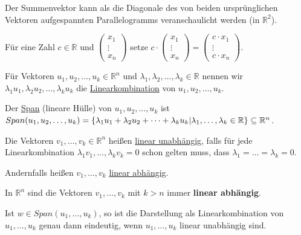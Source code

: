 \documentclass{mg2}
\begin{document}
Der Summenvektor kann als die Diagonale des von beiden ursprünglichen Vektoren aufgespannten Parallelogramms veranschaulicht werden (in $\mathbb{R}^2$).

\begin{definition}[Skalarmultiplikation]Für eine Zahl $c \in \mathbb{R}$ und $\begin{pmatrix}x_1\\ \vdots \\ x_n\end{pmatrix}$ setze $c \cdot \begin{pmatrix}x_1\\ \vdots \\ x_n\end{pmatrix} =\begin{pmatrix}c \cdot x_1\\ \vdots \\c \cdot  x_n\end{pmatrix}$.
\end{definition}

\begin{definition}
Für Vektoren $u_1, u_2,\dots,u_k \in \mathbb{R}^n$ und $\lambda_1,\lambda_2,\dots,\lambda_k \in \mathbb{R}$ nennen wir $\lambda_1 u_1, \lambda_2 u_2,\dots,\lambda_k u_k$ die \underline{Linearkombination} von $u_1, u_2,\dots,u_k$.

Der \underline{Span} (lineare Hülle) von $u_1, u_2, \dots, u_k$ ist $Span(u_1, u_2, \dots, u_k) \\
= \{ \lambda_1 u_1 + \lambda_2 u_2 + \dots + \lambda_k u_k | \lambda_1, \dots, \lambda_k \in \mathbb{R} \} \subseteq \mathbb{R}^n$.
\end{definition}

\begin{definition}
Die Vektoren $v_1, \dots, v_k \in \mathbb{R}^n$ heißen \underline{linear unabhängig}, falls für jede Linearkombination $\lambda_1 v_1, \dots, \lambda_k v_k = 0$ schon gelten muss, dass $\lambda_1 = \dots = \lambda_k = 0$.

Andernfalls heißen $v_1,\dots,v_k$ \underline{linear abhängig}.
\end{definition}

\begin{beobachtung} 
In $\mathbb{R}^n$ sind die Vektoren $v_1,\dots,v_k$ mit $k > n$ immer \textbf{linear abhängig}.
\end{beobachtung}

\begin{lemma}
Ist $w \in Span(u_1,\dots,u_k)$, so ist die Darstellung als Linearkombination von $u_1,\dots,u_k$ genau dann eindeutig, wenn $u_1,\dots,u_k$ linear unabhängig sind.
\end{lemma}
\end{document}

